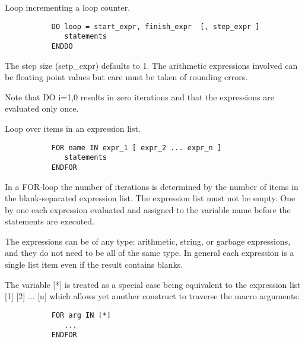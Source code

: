 \fi


   \par
Loop incrementing a loop counter.  

\begin{verbatim}
           DO loop = start_expr, finish_expr  [, step_expr ]
              statements
           ENDDO
\end{verbatim}
\ENDVERB
   \par
The step size (setp\_expr) defaults to \DQUOTE{}1\DQUOTE{}. The arithmetic 
   expressions involved can be floating point values but care must be taken of 
   rounding errors.  

   \par
Note that \DQUOTE{}DO i=1,0\DQUOTE{} results in zero iterations and that 
   the expressions are evaluated only once.  

\ENDCMD


   \par
Loop over items in an expression list.  

\begin{verbatim}
           FOR name IN expr_1 [ expr_2 ... expr_n ]
              statements
           ENDFOR
\end{verbatim}
\ENDVERB
   \par
In a FOR-loop the number of iterations is determined by the number of items 
   in the blank-separated expression list. The expression list must not be 
   empty. One by one each expression evaluated and assigned to the variable 
   name before the statements are executed.  

   \par
The expressions can be of any type: arithmetic, string, or garbage 
   expressions, and they do not need to be all of the same type. In general 
   each expression is a single list item even if the result contains blanks.  

   \par
The variable [*] is treated as a special case being equivalent to the 
   expression list \DQUOTE{}[1] [2] ... [n]\DQUOTE{} which allows yet another 
   construct to traverse the macro arguments:  

\begin{verbatim}
           FOR arg IN [*]
              ...
           ENDFOR
\end{verbatim}

